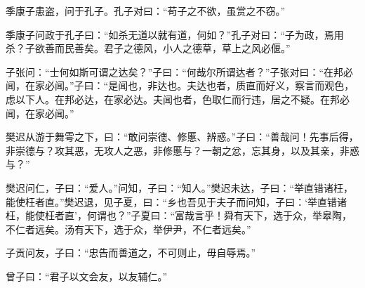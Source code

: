 \documentclass[12pt,a4paper]{ctexbook}
\begin{document}
季康子患盗，问于孔子。孔子对曰：“苟子之不欲，虽赏之不窃。”\par
季康子问政于孔子曰：“如杀无道以就有道，何如？”孔子对曰：“子为政，焉用杀？子欲善而民善矣。君子之德风，小人之德草，草上之风必偃。”\par
子张问：“士何如斯可谓之达矣？”子曰：“何哉尔所谓达者？”子张对曰：“在邦必闻，在家必闻。”子曰：“是闻也，非达也。夫达也者，质直而好义，察言而观色，虑以下人。在邦必达，在家必达。夫闻也者，色取仁而行违，居之不疑。在邦必闻，在家必闻。”\par
樊迟从游于舞雩之下，曰：“敢问崇德、修慝、辨惑。”子曰：“善哉问！先事后得，非崇德与？攻其恶，无攻人之恶，非修慝与？一朝之忿，忘其身，以及其亲，非惑与？”\par
樊迟问仁，子曰：“爱人。”问知，子曰：“知人。”樊迟未达，子曰：“举直错诸枉，能使枉者直。”樊迟退，见子夏，曰：“乡也吾见于夫子而问知，子曰：‘举直错诸枉，能使枉者直’，何谓也？”子夏曰：“富哉言乎！舜有天下，选于众，举皋陶，不仁者远矣。汤有天下，选于众，举伊尹，不仁者远矣。”\par
子贡问友，子曰：“忠告而善道之，不可则止，毋自辱焉。”\par
曾子曰：“君子以文会友，以友辅仁。”\par
\end{document}
